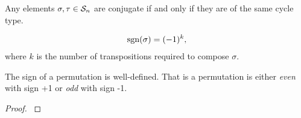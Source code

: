 		\begin{proposition}
			Any elements $\sigma, \tau \in \mathcal{S}_n$ are conjugate if and only if they are of the same cycle type.
		\end{proposition}
		
		\begin{definition}
			\begin{align*}
				\text{sgn}(\sigma) = (-1)^k,
			\end{align*}
			where $k$ is the number of transpositions required to compose $\sigma$.
		\end{definition}
		
		\begin{proposition}\label{prop:signwelldefined}
			The sign of a permutation is well-defined. That is a permutation is either \textit{even} with sign +1 or \textit{odd} with sign -1.
		\end{proposition}
		\begin{proof}
			\cite[Thm.12.6.1.]{Biggs}
		\end{proof}
		
		
		